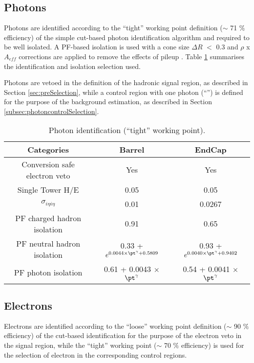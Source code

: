 \subsection{Photons}
\label{sec:photon-id}
Photons are identified according to the ``tight'' working point definition ($\sim$ 71 $\%$ efficiency) 
of the simple cut-based photon identification algorithm \cite{photon-id} 
and required to be well isolated. 
A PF-based isolation is used with a cone size $\Delta R$ $<$ 0.3 and $\rho$ x $A_{eff}$ corrections are applied to remove the effects of pileup \cite{pf-photon}. 
Table \ref{tab:photon-id-gamma} summarises the identification and isolation selection used. 

Photons are vetoed in the definition of the hadronic signal region, 
as described in Section \ref{sec:preSelection}, while a 
control region with one photon (``\gj'') is defined for the purpose of the background estimation, 
as described in Section \ref{subsec:photoncontrolSelection}.


\begin{table}[ht!]
  \caption{Photon identification (``tight'' working point).\label{tab:photon-id-gamma}}
  \centering
  \footnotesize
  \begin{tabular}{ ccc }
    \hline
    \hline
    Categories                    & Barrel                             & EndCap                             \\
    \hline
    Conversion safe electron veto & Yes                                & Yes                                \\
    Single Tower H/E              & 0.05                               & 0.05                               \\
    $\sigma_{i\eta i\eta}$        & 0.01                               & 0.0267                               \\
    PF charged hadron isolation   & 0.91                               & 0.65                               \\
    PF neutral hadron isolation   & 0.33 + $ e^{0.0044 \times \pt^{\gamma} + 0.5809}$  &  0.93 + $ e^{0.0040 \times \pt^{\gamma} + 0.9402}$ \\
    PF photon isolation           & 0.61 + 0.0043 $\times$ $\pt^{\gamma}$ & 0.54 + 0.0041 $\times$ $\pt^{\gamma}$ \\
    \hline
    \hline
  \end{tabular}
  \end{table}


\subsection{Electrons}
\label{sec:electron-id}
Electrons are identified according to the ``loose'' working point definition ($\sim$ 90 $\%$ efficiency) 
of the cut-based identification \cite{electron-id} for the purpose of the electron veto in the signal region, while the ``tight'' working point ($\sim$ 70 $\%$ efficiency) is used for the selection of electron in the corresponding control regions. 

